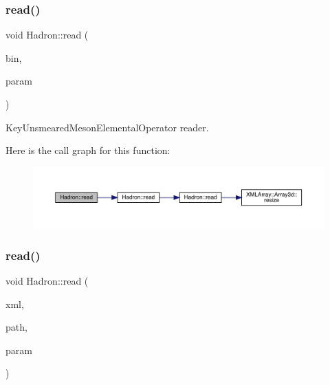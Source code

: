 \subsubsection{\texorpdfstring{read()}{read()}\hspace{0.1cm}{\footnotesize\ttfamily [26/94]}}
{\footnotesize\ttfamily void Hadron\+::read (\begin{DoxyParamCaption}\item[{\mbox{\hyperlink{classADATIO_1_1BinaryReader}{Binary\+Reader}} \&}]{bin,  }\item[{\mbox{\hyperlink{structHadron_1_1KeyUnsmearedMesonElementalOperator__t}{Key\+Unsmeared\+Meson\+Elemental\+Operator\+\_\+t}} \&}]{param }\end{DoxyParamCaption})}



Key\+Unsmeared\+Meson\+Elemental\+Operator reader. 

Here is the call graph for this function\+:\nopagebreak
\begin{figure}[H]
\begin{center}
\leavevmode
\includegraphics[width=350pt]{d1/daf/namespaceHadron_a1a172c91f55bd8989d9751c7f8b5ac28_cgraph}
\end{center}
\end{figure}
\mbox{\label{namespaceHadron_a0651834c5f37836ea0e1e081b4214546}} 
\subsubsection{\texorpdfstring{read()}{read()}\hspace{0.1cm}{\footnotesize\ttfamily [27/94]}}
{\footnotesize\ttfamily void Hadron\+::read (\begin{DoxyParamCaption}\item[{\mbox{\hyperlink{classADATXML_1_1XMLReader}{X\+M\+L\+Reader}} \&}]{xml,  }\item[{const std\+::string \&}]{path,  }\item[{\mbox{\hyperlink{structHadron_1_1KeyGlueElementalOperator__t}{Key\+Glue\+Elemental\+Operator\+\_\+t}} \&}]{param }\end{DoxyParamCaption})}



